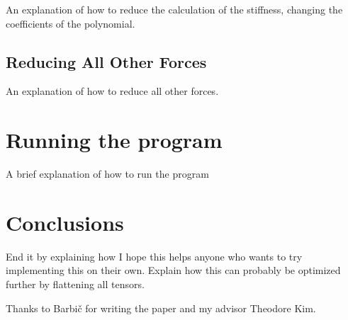 \documentclass[twocolumn,10pt]{asme2ej}
\begin{document}
An explanation of how to reduce the calculation of the stiffness, changing the coefficients
of the polynomial.

\subsection{Reducing All Other Forces}

An explanation of how to reduce all other forces.

\section{Running the program}

A brief explanation of how to run the program

\section{Conclusions}

End it by explaining how I hope this helps anyone who wants to try implementing this on their own.
Explain how this can probably be optimized further by flattening all tensors.

\begin{acknowledgment}

Thanks to Barbič for writing the paper and my advisor Theodore Kim.

\end{acknowledgment}


%
\end{document}
